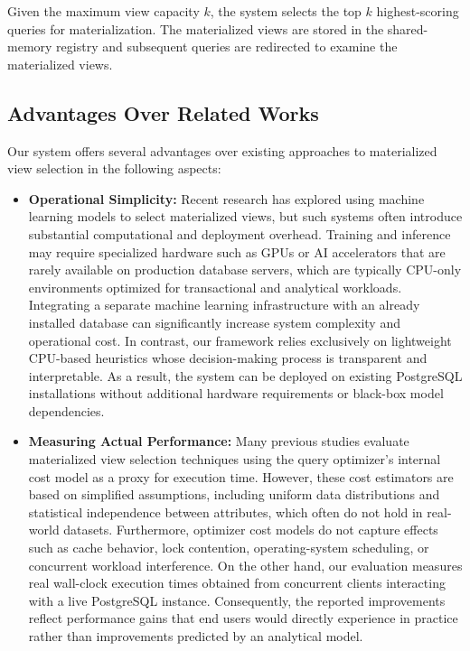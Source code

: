 Given the maximum view capacity $k$, the system selects the top $k$ highest-scoring queries for materialization. The materialized views are stored in the shared-memory registry and subsequent queries are redirected to examine the materialized views.

\subsection{Advantages Over Related Works}

Our system offers several advantages over existing approaches to materialized view selection in the following aspects:

\begin{itemize}

\item \textbf{Operational Simplicity:} Recent research has explored using machine learning models to select materialized views, but such systems often introduce substantial computational and deployment overhead. Training and inference may require specialized hardware such as GPUs or AI accelerators that are rarely available on production database servers, which are typically CPU-only environments optimized for transactional and analytical workloads. Integrating a separate machine learning infrastructure with an already installed database can significantly increase system complexity and operational cost. In contrast, our framework relies exclusively on lightweight CPU-based heuristics whose decision-making process is transparent and interpretable. As a result, the system can be deployed on existing PostgreSQL installations without additional hardware requirements or black-box model dependencies.

\item \textbf{Measuring Actual Performance:} Many previous studies evaluate materialized view selection techniques using the query optimizer's internal cost model as a proxy for execution time. However, these cost estimators are based on simplified assumptions, including uniform data distributions and statistical independence between attributes, which often do not hold in real-world datasets. Furthermore, optimizer cost models do not capture effects such as cache behavior, lock contention, operating-system scheduling, or concurrent workload interference. On the other hand, our evaluation measures real wall-clock execution times obtained from concurrent clients interacting with a live PostgreSQL instance. Consequently, the reported improvements reflect performance gains that end users would directly experience in practice rather than improvements predicted by an analytical model.


\end{itemize}
